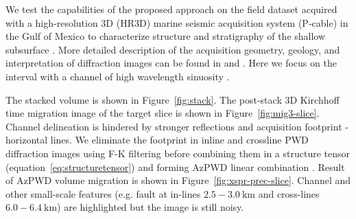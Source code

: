 We test the capabilities of the proposed approach on the field dataset acquired with a high-resolution 3D (HR3D)
marine seismic acquisition system (P-cable) in the Gulf of Mexico to characterize structure and stratigraphy of
the shallow subsurface \cite[]{meckel2016use,klokov2017diffraction,merzlikin2017diffraction,sgreer18}.
 More detailed description of the acquisition geometry, geology, and interpretation of diffraction images can be found in
\cite{klokov2017diffraction} and \cite{merzlikin2017diffraction}.
Here we focus on the interval with a channel of high wavelength sinuosity \cite[]{merzlikin2017diffraction}.

The stacked volume is shown in Figure~\ref{fig:stack}.
The post-stack 3D Kirchhoff time migration image of the target slice is shown in Figure~\ref{fig:mig3-slice}.
Channel delineation is hindered by stronger reflections and acquisition footprint - horizontal lines. 
We eliminate the footprint in inline and crossline PWD diffraction images using F-K filtering before
combining them in a structure tensor (equation~\ref{eq:structuretensor}) and forming AzPWD linear combination \cite[]{merzlikin2017diffraction}.
Result of AzPWD volume migration is shown in Figure~\ref{fig:xspr-prec-slice}.
Channel and other small-scale features (e.g. fault at in-lines $2.5-3.0\ \text{km}$ and cross-lines $6.0-6.4\ \text{km}$) are highlighted but the image is still noisy.

